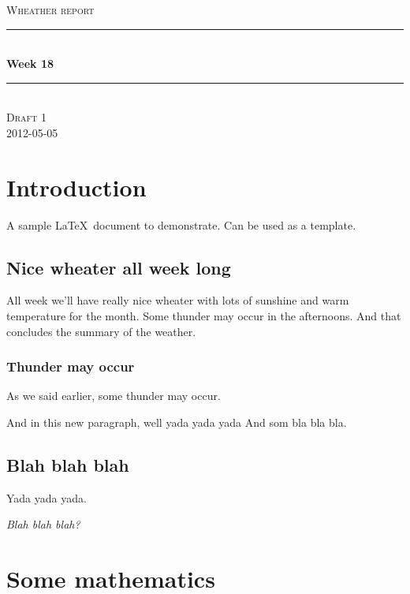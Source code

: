 \documentclass[11pt,a4paper]{article}
\newcommand{\HRule}{\rule{\linewidth}{0.5mm}}
\begin{document}
\begin{titlepage}
\begin{center}
\vspace*{3.5 cm}
\textsc{\LARGE Wheather report}\\[1.5cm]


\HRule \\[0.5cm]
{ \huge \bfseries Week 18}\\[0.4cm]
\HRule \\[1.5cm]

\textsc{\Large Draft 1}\\[0.5cm]
\textsc{\Large 2012-05-05}\\[0.5cm]

\end{center}
\end{titlepage}

\tableofcontents
\pagebreak

\section{Introduction}

A sample \LaTeX\ document to demonstrate. Can be used as a template.


\subsection{Nice wheater all week long}

All week we'll have really nice wheater with lots of sunshine and warm 
temperature for the month.
Some thunder may occur in the afternoons.
And that concludes the summary of the weather.

\subsubsection{Thunder may occur}

As we said earlier, some thunder may occur.

And in this new paragraph, well yada yada yada
And som bla bla bla.

\subsection{Blah blah blah}

Yada yada yada.

\textit{Blah blah blah?}


\section{Some mathematics}
\end{document}
